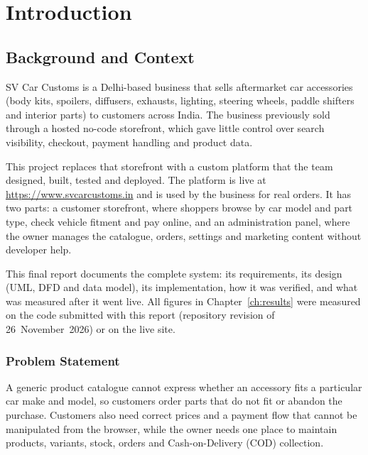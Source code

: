 \documentclass{tietreport}
\begin{document}
\maketitle
{}
\tableofcontents
\listoffigures
\listoftables
\cleardoublepage
{}

\chapter{Introduction}

\section{Background and Context}

SV Car Customs is a Delhi-based business that sells aftermarket car
accessories (body kits, spoilers, diffusers, exhausts, lighting, steering
wheels, paddle shifters and interior parts) to customers across India. The
business previously sold through a hosted no-code storefront, which gave
little control over search visibility, checkout, payment handling and product
data.

This project replaces that storefront with a custom platform that the team
designed, built, tested and deployed. The platform is live at
\url{https://www.svcarcustoms.in} and is used by the business for real
orders. It has two parts: a customer storefront, where shoppers browse by car
model and part type, check vehicle fitment and pay online, and an
administration panel, where the owner manages the catalogue, orders, settings
and marketing content without developer help.

This final report documents the complete system: its requirements, its design
(UML, DFD and data model), its implementation, how it was verified, and what
was measured after it went live. All figures in Chapter~\ref{ch:results} were
measured on the code submitted with this report (repository revision of
26~November~2026) or on the live site.

\subsection{Problem Statement}

A generic product catalogue cannot express whether an accessory fits a
particular car make and model, so customers order parts that do not fit or
abandon the purchase. Customers also need correct prices and a payment flow
that cannot be manipulated from the browser, while the owner needs one place
to maintain products, variants, stock, orders and Cash-on-Delivery (COD)
collection.
\end{document}
